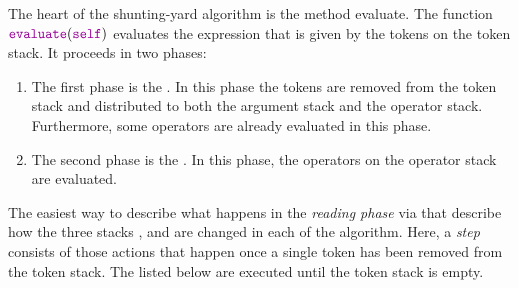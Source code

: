 The heart of the shunting-yard algorithm is the method evaluate.
The function $\mytt{evaluate}(\mytt{self})$ evaluates the expression that is given by the tokens on the
token stack.  It proceeds in two phases:
\begin{enumerate}
\item The first phase is the . In this phase
      the tokens are removed from the token stack and distributed to both the argument stack and the operator
      stack.  Furthermore, some operators are already evaluated in this phase.
\item The second phase is the .  In this phase,
      the  operators on the operator stack are evaluated.  
\end{enumerate}
The easiest way to describe what happens in the \emph{reading phase} via
 that describe how the three stacks ,  and 
are changed in each  of the algorithm.  Here, a \emph{step} consists of those actions that happen
once a single token has been removed from the token stack.
The  listed below are executed until the token stack is empty.
